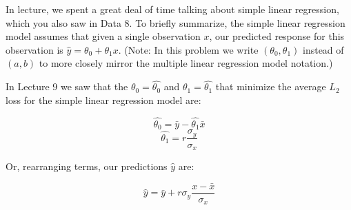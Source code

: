 \documentclass[addpoints, 12pt]{exam}
\theoremstyle{definition}
\newtheorem*{answer}{Answer}
\begin{document}
\newpage

\begin{questions}

\vspace{-1em}

\question[7] In lecture, we spent a great deal of time talking about  simple linear regression, which you also saw in Data 8. To briefly summarize, the simple linear regression model assumes that given a single observation $x$, our predicted response for this observation is $\hat{y} = \theta_0 + \theta_1x$. {\small (Note: In this problem we write $(\theta_0, \theta_1)$ instead of $(a, b)$ to more closely mirror the multiple linear regression model notation.)}

In Lecture 9 we saw that the $\theta_0 = \hat{\theta_0}$ and $\theta_1 = \hat{\theta_1}$ that minimize the average $L_2$ loss for the simple linear regression model are:

$$\hat{\theta_0} = \bar{y} - \hat{\theta_1}\bar{x} $$
$$\hat{\theta_1} = r\frac{\sigma_y}{\sigma_x}$$

Or, rearranging terms, our predictions $\hat{y}$ are:

$$\hat{y} = \bar{y} + r \sigma_y \frac{x - \bar{x}}{\sigma_x}$$

\end{questions}
\end{document}
